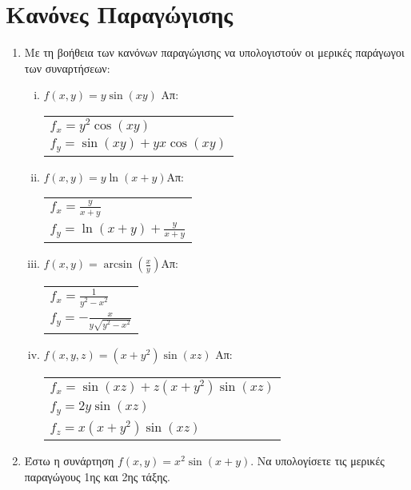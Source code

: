 



\pagestyle{askhseis}
\everymath{\displaystyle}



\begin{center}
  {\color{Col2}}
\end{center}

\section*{Κανόνες Παραγώγισης}

\begin{enumerate}
  \item Με τη βοήθεια των κανόνων παραγώγισης να υπολογιστούν οι μερικές 
    παράγωγοι των συναρτήσεων:

    \begin{enumerate}[i)]
      \item $f(x,y)=y\sin (xy)$ \hfill Απ: \begin{tabular}{l}
          $f_x=y^2\cos(xy)$ \\ 
          $f_y=\sin(xy)+yx\cos(xy)$
        \end{tabular}

      \item $f(x,y)=y\ln(x+y)$\hfill Απ: \begin{tabular}{l}
          $f_x=\frac{y}{x+y}$ \\ 
          $f_y=\ln(x+y)+\frac{y}{x+y}$
        \end{tabular}

      \item $f(x,y)=\arcsin(\frac{x}{y})$\hfill Απ: \begin{tabular}{l}
          $f_x=\frac{1}{y^2-x^2}$ \\ 
          $f_y=-\frac{x}{y\sqrt{y^2-x^2}}$
        \end{tabular}
      \item $ f(x,y,z) = (x+y^{2}) \sin{(xz)} $ \hfill Απ: \begin{tabular}{l}
          $ f_{x} = \sin{(xz)} + z(x+y^{2}) \sin{(xz)} $ \\
          $ f_{y} = 2y \sin{(xz)} $ \\
          $ f_{z} = x(x+y^{2}) \sin{(xz)} $
        \end{tabular} 
    \end{enumerate}

  \item Έστω η συνάρτηση $ f(x,y) = x^{2} \sin{(x+y)} $. Να υπολογίσετε τις μερικές 
    παραγώγους 1ης και 2ης τάξης.


\end{enumerate}
